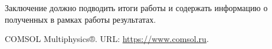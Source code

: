 
Заключение должно подводить итоги работы и содержать информацию о полученных в рамках работы результатах.

\newpage
\begin{thebibliography}{1}
 COMSOL Multiphysics®﻿. URL: \url{https://www.comsol.ru}.
\end{thebibliography}